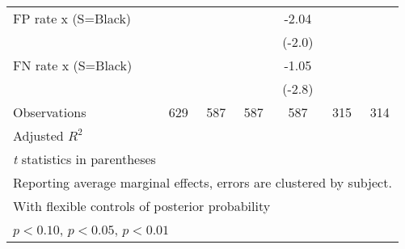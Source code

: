 \begin{table}[htbp]
\begin{tabular}{l*{6}{c}}
FP rate x (S=Black)&                  &                  &                  &    -2.04\sym{**} &                  &                  \\
                &                  &                  &                  &   (-2.0)         &                  &                  \\
FN rate x (S=Black)&                  &                  &                  &    -1.05\sym{***}&                  &                  \\
                &                  &                  &                  &   (-2.8)         &                  &                  \\
\hline
Observations    &      629         &      587         &      587         &      587         &      315         &      314         \\
Adjusted \(R^{2}\)&                  &                  &                  &                  &                  &                  \\
\hline\hline
\multicolumn{7}{l}{\footnotesize \textit{t} statistics in parentheses}\\
\multicolumn{7}{l}{\footnotesize Reporting average marginal effects, errors are clustered by subject.}\\
\multicolumn{7}{l}{\footnotesize With flexible controls of posterior probability}\\
\multicolumn{7}{l}{\footnotesize \sym{*} \(p<0.10\), \sym{**} \(p<0.05\), \sym{***} \(p<0.01\)}\\
\end{tabular}
\end{table}
